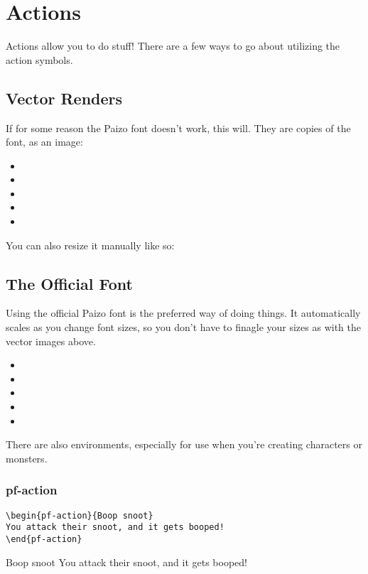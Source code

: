 \chapter{Actions}

\begin{multicols}{2}

Actions allow you to do stuff!
There are a few ways to go about utilizing the action symbols.

\section{Vector Renders}

If for some reason the Paizo font doesn't work, this will.
They are copies of the font, as an image:

\begin{itemize}
  \item \showmacro{\actionIcon}
  \item \showmacro{\activityTwoIcon}
  \item \showmacro{\activityThreeIcon}
  \item \showmacro{\freeActionIcon}
  \item \showmacro{\reactionIcon}
\end{itemize}

You can also resize it manually like so: \showmacro{\actionIcon[2]}

\section{The Official Font}

Using the official Paizo font is the preferred way of doing things.
It automatically scales as you change font sizes, so you don't have to finagle your sizes as with the vector images above.

\begin{itemize}
  \item \showmacro{\oneAction}
  \item \showmacro{\twoAction}
  \item \showmacro{\threeAction}
  \item \showmacro{\freeAction}
  \item \showmacro{\reaction}
\end{itemize}

There are also environments, especially for use when you're creating characters or monsters.

\subsection{pf-action}
\begin{verbatim}
\begin{pf-action}{Boop snoot}
You attack their snoot, and it gets booped!
\end{pf-action}
\end{verbatim}
\begin{pf-action}{Boop snoot}
You attack their snoot, and it gets booped!
\end{pf-action}


\end{multicols}
